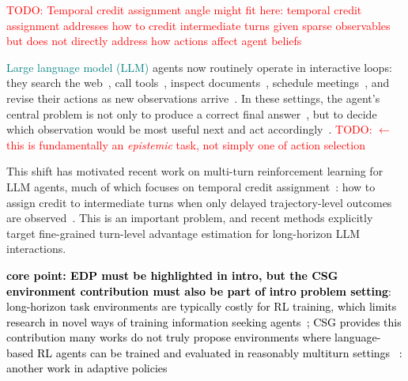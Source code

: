 \documentclass[11pt]{article}
\newcommand{\an}[1]{\textcolor{black}{#1}}
\newcommand{\nk}[1]{\textcolor{teal}{#1}}
\newcommand{\todo}[1]{\textcolor{red}{TODO: #1}}
\theoremstyle{plain}
\theoremstyle{definition}
\theoremstyle{remark}
\begin{document}
\iffalse
\todo{Temporal credit assignment angle might fit here: temporal credit assignment addresses how to credit intermediate turns given sparse observables but does not directly address how actions affect agent beliefs}




\nk{Large language model (LLM)} agents now routinely operate in interactive loops: they search the web~\citep{deng2023mind2web,yao2022webshop,Zhou2023WebArenaAR}, call tools~\citep{schick2023toolformer}, inspect documents~\citep{zhang-etal-2025-belle}, schedule meetings~\citep{zou2026calbenchevaluatingcoordinationprivacytradeoffs}, and revise their actions as new observations arrive~\citep{yao2022react,ferrag2025llm}. In these settings, the agent’s central problem is not only to produce a correct final answer~\citep{fan2025ssrl, jinsearch,shao2025llm}, but to decide which observation would be most useful next and act accordingly~\citep{bae2025alignsearchbeliefguidedexploratory, hua2026learningexplorescalingagentic}. \todo{$\leftarrow$ this is fundamentally an {\it epistemic} task, not simply one of action selection}



This shift has motivated recent work on multi-turn reinforcement learning for LLM agents, much of which focuses on temporal credit assignment~\citep{sutton1984temporal}: how to assign credit to intermediate turns when only delayed trajectory-level outcomes are observed~\citep{shani2024multiturnreinforcementlearningpreference, wei2025reinforcingmultiturnreasoningllm}. This is an important problem, and recent methods explicitly target fine-grained turn-level advantage estimation for long-horizon LLM interactions.

\an{\textbf{core point: EDP must be highlighted in intro, but the CSG environment contribution must also be part of intro problem setting}: long-horizon task environments are typically costly for RL training, which limits research in novel ways of training information seeking agents~\citep{abdulhai2023lmrl}; CSG provides this contribution many works do not truly propose environments where language-based RL agents can be trained and evaluated in reasonably multiturn settings~\citep{singh2026multilevel, chen2026learning}}
\an{\citep{nideployable}: another work in adaptive policies}
\end{document}
